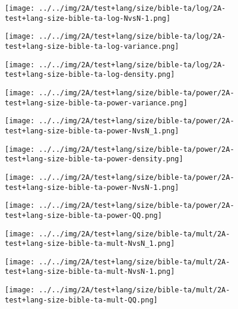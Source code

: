 \begin{figure}[H]
\centering	\texttt{[image: ../../img/2A/test+lang/size/bible-ta/log/2A-test+lang-size-bible-ta-log-NvsN-1.png]}
\end{figure}
\begin{figure}[H]
\centering	\texttt{[image: ../../img/2A/test+lang/size/bible-ta/log/2A-test+lang-size-bible-ta-log-variance.png]}
\end{figure}
\begin{figure}[H]
\centering	\texttt{[image: ../../img/2A/test+lang/size/bible-ta/log/2A-test+lang-size-bible-ta-log-density.png]}
\end{figure}
\begin{figure}[H]
\centering	\texttt{[image: ../../img/2A/test+lang/size/bible-ta/power/2A-test+lang-size-bible-ta-power-variance.png]}
\end{figure}
\begin{figure}[H]
\centering	\texttt{[image: ../../img/2A/test+lang/size/bible-ta/power/2A-test+lang-size-bible-ta-power-NvsN\_1.png]}
\end{figure}
\begin{figure}[H]
\centering	\texttt{[image: ../../img/2A/test+lang/size/bible-ta/power/2A-test+lang-size-bible-ta-power-density.png]}
\end{figure}
\begin{figure}[H]
\centering	\texttt{[image: ../../img/2A/test+lang/size/bible-ta/power/2A-test+lang-size-bible-ta-power-NvsN-1.png]}
\end{figure}
\begin{figure}[H]
\centering	\texttt{[image: ../../img/2A/test+lang/size/bible-ta/power/2A-test+lang-size-bible-ta-power-QQ.png]}
\end{figure}
\begin{figure}[H]
\centering	\texttt{[image: ../../img/2A/test+lang/size/bible-ta/mult/2A-test+lang-size-bible-ta-mult-NvsN\_1.png]}
\end{figure}
\begin{figure}[H]
\centering	\texttt{[image: ../../img/2A/test+lang/size/bible-ta/mult/2A-test+lang-size-bible-ta-mult-NvsN-1.png]}
\end{figure}
\begin{figure}[H]
\centering	\texttt{[image: ../../img/2A/test+lang/size/bible-ta/mult/2A-test+lang-size-bible-ta-mult-QQ.png]}
\end{figure}
